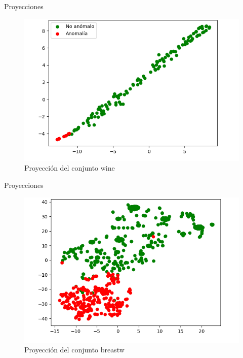 \documentclass[10pt]{beamer}
\begin{document}
\begin{frame}[fragile]{Proyecciones}
\vspace{10px}

\begin{figure}
	\centering
	\includegraphics[scale=0.6]{Imagenes/wine}
	\caption*{Proyección del conjunto wine}
\end{figure}

\end{frame}

\begin{frame}[fragile]{Proyecciones}
\vspace{10px}

\begin{figure}
	\centering
	\includegraphics[scale=0.6]{Imagenes/breastw}
	\caption*{Proyección del conjunto breastw}
\end{figure}

\end{frame}
\end{document}
